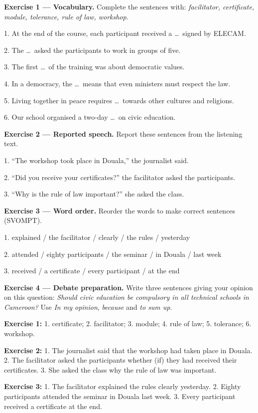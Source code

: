 \documentclass[11pt]{article}
\begin{document}
\begin{exercice}[Practice]
\textbf{Exercise 1 --- Vocabulary.} Complete the sentences with: \emph{facilitator, certificate, module, tolerance, rule of law, workshop}.\par
1. At the end of the course, each participant received a \ldots\ signed by ELECAM.\par
2. The \ldots\ asked the participants to work in groups of five.\par
3. The first \ldots\ of the training was about democratic values.\par
4. In a democracy, the \ldots\ means that even ministers must respect the law.\par
5. Living together in peace requires \ldots\ towards other cultures and religions.\par
6. Our school organised a two-day \ldots\ on civic education.\par
\textbf{Exercise 2 --- Reported speech.} Report these sentences from the listening text.\par
1. ``The workshop took place in Douala,'' the journalist said.\par
2. ``Did you receive your certificates?'' the facilitator asked the participants.\par
3. ``Why is the rule of law important?'' she asked the class.\par
\textbf{Exercise 3 --- Word order.} Reorder the words to make correct sentences (SVOMPT).\par
1. explained / the facilitator / clearly / the rules / yesterday\par
2. attended / eighty participants / the seminar / in Douala / last week\par
3. received / a certificate / every participant / at the end\par
\textbf{Exercise 4 --- Debate preparation.} Write three sentences giving your opinion on this question: \emph{Should civic education be compulsory in all technical schools in Cameroon?} Use \emph{In my opinion}, \emph{because} and \emph{to sum up}.
\end{exercice}

\begin{corrige}
\textbf{Exercise 1:} 1. certificate; 2. facilitator; 3. module; 4. rule of law; 5. tolerance; 6. workshop.\par
\textbf{Exercise 2:} 1. The journalist said that the workshop had taken place in Douala. 2. The facilitator asked the participants whether (if) they had received their certificates. 3. She asked the class why the rule of law was important.\par
\textbf{Exercise 3:} 1. The facilitator explained the rules clearly yesterday. 2. Eighty participants attended the seminar in Douala last week. 3. Every participant received a certificate at the end.
\end{corrige}
\end{document}
